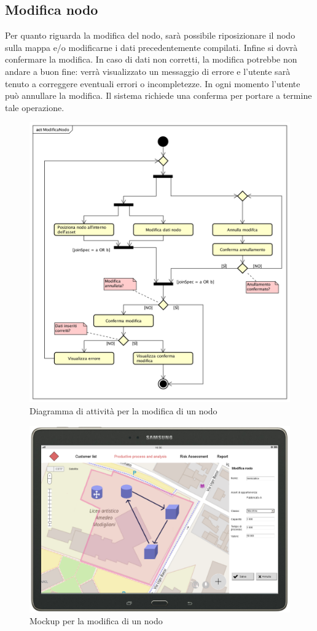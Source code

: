 \subsection{Modifica nodo}
Per quanto riguarda la modifica del nodo, sarà possibile riposizionare il nodo sulla mappa e/o modificarne i dati precedentemente compilati. Infine si dovrà confermare la modifica. In caso di dati non corretti, la modifica potrebbe non andare a buon fine: verrà visualizzato un messaggio di errore e l'utente sarà tenuto a correggere eventuali errori o incompletezze.
In ogni momento l'utente può annullare la modifica. Il sistema richiede una conferma per portare a termine tale operazione.
\begin{figure}[H]
	\centering
	\includegraphics[width=\textwidth]{img/DiagrammiDiAttivita/ModificaNodo.png}
	\caption{Diagramma di attività per la modifica di un nodo}
\end{figure}
\begin{figure}[H]
	\centering
	\includegraphics[width=\textwidth]{img/MockUp/m14.png}
	\caption{Mockup per la modifica di un nodo}
\end{figure}

